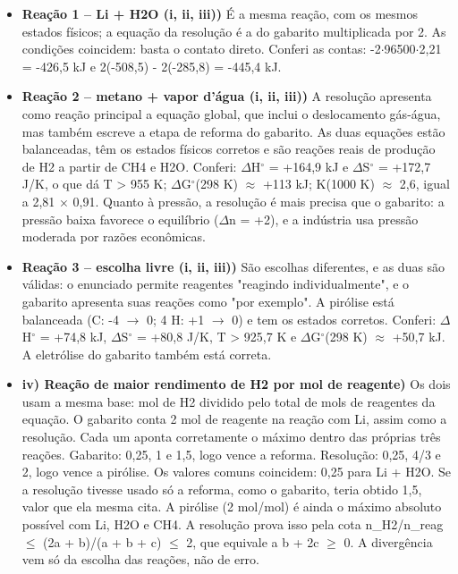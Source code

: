 \documentclass{article}%
\begin{document}
\begin{itemize}%
\item%
\textbf{Reação 1 -- Li + H2O (i, ii, iii))} É a mesma reação, com os mesmos estados físicos; a equação da resolução é a do gabarito multiplicada por 2. As condições coincidem: basta o contato direto. Conferi as contas: -2$\cdot$96500$\cdot$2,21 = -426,5 kJ e 2(-508,5) - 2(-285,8) = -445,4 kJ.%
\item%
\textbf{Reação 2 -- metano + vapor d'água (i, ii, iii))} A resolução apresenta como reação principal a equação global, que inclui o deslocamento gás{-}água, mas também escreve a etapa de reforma do gabarito. As duas equações estão balanceadas, têm os estados físicos corretos e são reações reais de produção de H2 a partir de CH4 e H2O. Conferi: $\Delta$H$^\circ$ = +164,9 kJ e $\Delta$S$^\circ$ = +172,7 J/K, o que dá T > 955 K; $\Delta$G$^\circ$(298 K) $\approx$ +113 kJ; K(1000 K) $\approx$ 2,6, igual a 2,81 $\times$ 0,91. Quanto à pressão, a resolução é mais precisa que o gabarito: a pressão baixa favorece o equilíbrio ($\Delta$n = +2), e a indústria usa pressão moderada por razões econômicas.%
\item%
\textbf{Reação 3 -- escolha livre (i, ii, iii))} São escolhas diferentes, e as duas são válidas: o enunciado permite reagentes "reagindo individualmente", e o gabarito apresenta suas reações como "por exemplo". A pirólise está balanceada (C: -4 $\to$ 0; 4 H: +1 $\to$ 0) e tem os estados corretos. Conferi: $\Delta$H$^\circ$ = +74,8 kJ, $\Delta$S$^\circ$ = +80,8 J/K, T > 925,7 K e $\Delta$G$^\circ$(298 K) $\approx$ +50,7 kJ. A eletrólise do gabarito também está correta.%
\item%
\textbf{iv) Reação de maior rendimento de H2 por mol de reagente)} Os dois usam a mesma base: mol de H2 dividido pelo total de mols de reagentes da equação. O gabarito conta 2 mol de reagente na reação com Li, assim como a resolução. Cada um aponta corretamente o máximo dentro das próprias três reações. Gabarito: 0,25, 1 e 1,5, logo vence a reforma. Resolução: 0,25, 4/3 e 2, logo vence a pirólise. Os valores comuns coincidem: 0,25 para Li + H2O. Se a resolução tivesse usado só a reforma, como o gabarito, teria obtido 1,5, valor que ela mesma cita. A pirólise (2 mol/mol) é ainda o máximo absoluto possível com Li, H2O e CH4. A resolução prova isso pela cota n\_H2/n\_reag $\leq$ (2a + b)/(a + b + c) $\leq$ 2, que equivale a b + 2c $\geq$ 0. A divergência vem só da escolha das reações, não de erro.%
\end{itemize}%
\end{document}
